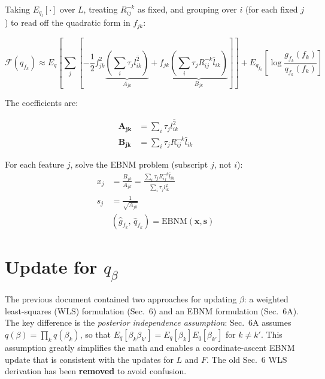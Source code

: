 \documentclass{article}[12pt]
\newcommand{\lbar}[2]{\bar{l}_{#1#2}}
\newcommand{\lsec}[2]{\overline{l^{2}_{#1#2}}}
\begin{document}
Taking $E_{q_l}[\cdot]$ over $L$, treating $R^{-k}_{ij}$ as fixed, and grouping
over $i$ (for each fixed $j$) to read off the quadratic form in $f_{jk}$:

\begin{equation}
    \mathcal{F}(q_{f_k}) \approx E_{q}\!\left[\sum_j\left[
        -\frac{1}{2}f_{jk}^{2}\underbrace{\left(\sum_i\tau_j\lsec{i}{k}\right)}_{A_{jk}}
        + f_{jk}\underbrace{\left(\sum_i\tau_j R^{-k}_{ij}\lbar{i}{k}\right)}_{B_{jk}}
    \right]\right]
    + E_{q_{f_k}}\!\left[\log\frac{g_{f_k}(f_k)}{q_{f_k}(f_k)}\right]
\end{equation}

The coefficients are:

\begin{align}
    \mathbf{A_{jk}} &= \sum_{i}\tau_j\lsec{i}{k}
    \label{eq:A-F}\\
    \mathbf{B_{jk}} &= \sum_{i}\tau_j R^{-k}_{ij}\lbar{i}{k}
    \label{eq:B-F}
\end{align}

\begin{ebnmbox}
For each feature $j$, solve the EBNM problem (subscript $j$, not $i$):
\begin{align}
    x_j &= \frac{B_{jk}}{A_{jk}}
         = \frac{\displaystyle\sum_i\tau_j R^{-k}_{ij}\lbar{i}{k}}
                {\displaystyle\sum_i\tau_j\lsec{i}{k}}
    \label{eq:xj-F}\\[4pt]
    s_j &= \frac{1}{\sqrt{A_{jk}}}
    \label{eq:sj-F}\\[4pt]
    &\left(\hat{g}_{f_k},\,\hat{q}_{f_k}\right)
      = \mathrm{EBNM}(\mathbf{x}, \mathbf{s})
\end{align}
\end{ebnmbox}

\section{Update for $q_{\beta}$}

\begin{correctionbox}[title={Item 3 Fix: Removed WLS Derivation; EBNM Approach Only}]
The previous document contained two approaches for updating $\beta$: a weighted
least-squares (WLS) formulation (Sec.~6) and an EBNM formulation (Sec.~6A).
The key difference is the \emph{posterior independence assumption}:
Sec.~6A assumes $q(\beta) = \prod_k q(\beta_k)$, so that
$E_q[\beta_k\beta_{k'}] = E_q[\beta_k]E_q[\beta_{k'}]$ for $k\neq k'$.
This assumption greatly simplifies the math and enables a coordinate-ascent
EBNM update that is consistent with the updates for $L$ and $F$. The old
Sec.~6 WLS derivation has been \textbf{removed} to avoid confusion.
\end{correctionbox}
\end{document}
